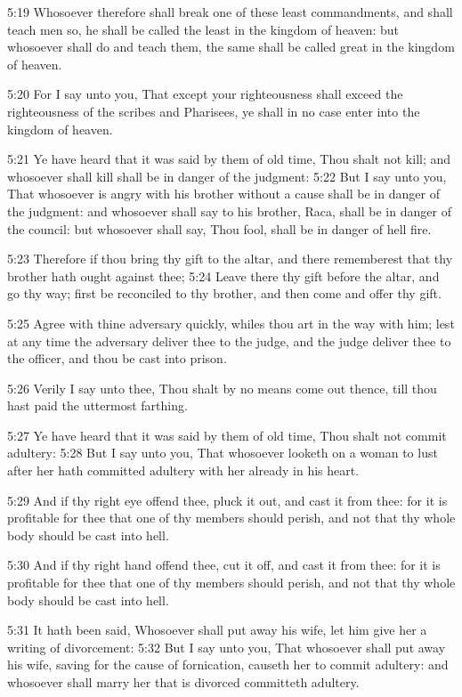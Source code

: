 5:19 Whosoever therefore shall break one of these least commandments,
and shall teach men so, he shall be called the least in the kingdom of
heaven: but whosoever shall do and teach them, the same shall be
called great in the kingdom of heaven.

5:20 For I say unto you, That except your righteousness shall exceed
the righteousness of the scribes and Pharisees, ye shall in no case
enter into the kingdom of heaven.

5:21 Ye have heard that it was said by them of old time, Thou shalt
not kill; and whosoever shall kill shall be in danger of the judgment:
5:22 But I say unto you, That whosoever is angry with his brother
without a cause shall be in danger of the judgment: and whosoever
shall say to his brother, Raca, shall be in danger of the council: but
whosoever shall say, Thou fool, shall be in danger of hell fire.

5:23 Therefore if thou bring thy gift to the altar, and there
rememberest that thy brother hath ought against thee; 5:24 Leave there
thy gift before the altar, and go thy way; first be reconciled to thy
brother, and then come and offer thy gift.

5:25 Agree with thine adversary quickly, whiles thou art in the way
with him; lest at any time the adversary deliver thee to the judge,
and the judge deliver thee to the officer, and thou be cast into
prison.

5:26 Verily I say unto thee, Thou shalt by no means come out thence,
till thou hast paid the uttermost farthing.

5:27 Ye have heard that it was said by them of old time, Thou shalt
not commit adultery: 5:28 But I say unto you, That whosoever looketh
on a woman to lust after her hath committed adultery with her already
in his heart.

5:29 And if thy right eye offend thee, pluck it out, and cast it from
thee: for it is profitable for thee that one of thy members should
perish, and not that thy whole body should be cast into hell.

5:30 And if thy right hand offend thee, cut it off, and cast it from
thee: for it is profitable for thee that one of thy members should
perish, and not that thy whole body should be cast into hell.

5:31 It hath been said, Whosoever shall put away his wife, let him
give her a writing of divorcement: 5:32 But I say unto you, That
whosoever shall put away his wife, saving for the cause of
fornication, causeth her to commit adultery: and whosoever shall marry
her that is divorced committeth adultery.

